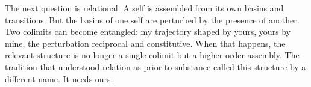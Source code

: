 The next question is relational. A self is assembled from its own basins and transitions. But the basins of one self are perturbed by the presence of another. Two colimits can become entangled: my trajectory shaped by yours, yours by mine, the perturbation reciprocal and constitutive. When that happens, the relevant structure is no longer a single colimit but a higher-order assembly. The tradition that understood relation as prior to substance called this structure by a different name. It needs ours.
